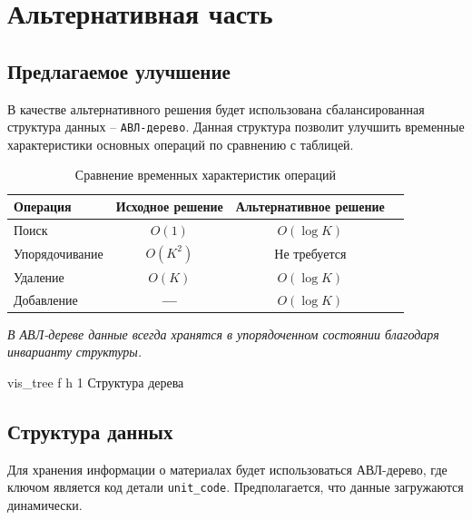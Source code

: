 \documentclass{bmstu}
\begin{document}
    \clearpage

    \chapter{Альтернативная часть}

    \section{Предлагаемое улучшение}

    В качестве альтернативного решения будет использована сбалансированная структура данных -- \texttt{АВЛ-дерево}. 
    Данная структура позволит улучшить временные характеристики основных операций по сравнению с таблицей.

    \begin{table}[H]
        \centering
        \begin{tabular}{|l|c|c|c|}
            \hline
            \textbf{Операция} & \textbf{Исходное решение} & \textbf{Альтернативное решение} \\
            \hline
            Поиск & $O(1)$ & $O(\log K)$  \\
            \hline
            Упорядочивание & $O(K^2)$ & Не требуется \\
            \hline
            Удаление & $O(K)$ & $O(\log K)$ \\
            \hline
            Добавление & \textbf{---} & $O(\log K)$  \\
            \hline
        \end{tabular}
        \caption{Сравнение временных характеристик операций}
    \end{table}

    \textit{В АВЛ-дереве данные всегда хранятся в упорядоченном состоянии благодаря инварианту структуры.}

        {vis_tree} %
        {f} %
        {h} %
        {1\textwidth} %
        {Структура дерева} %


    \section{Структура данных}

    Для хранения информации о материалах будет использоваться АВЛ-дерево, где ключом является код детали 
    \texttt{unit\_code}. Предполагается, что данные загружаются динамически.
\end{document}
